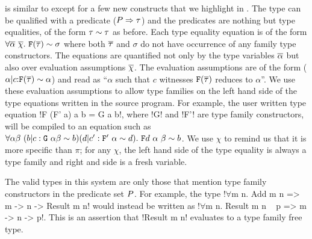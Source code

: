 \documentclass[format=acmsmall,manuscript,review,screen,nonacm,margin=1in,11pt]{acmart}
\begin{document}
\QLTF is similar to \CLTF except for a few new constructs that
we highlight in . The type can be qualified with a predicate ($P\Rightarrow\tau$)
and the predicates are nothing but type equalities, of the form $\tau\mathrel{\sim}\tau$ as before.
Each type equality equation is of the form $\forall\overline{\alpha}~\overline{\chi}.~\texttt{F}(\overline{\tau})\mathrel{\sim}\sigma$
where both $\overline{\tau}$ and $\sigma$ do not have occurrence of any family type constructors. 
The equations are quantified not only by the type variables $\overline{\alpha}$
but also over evaluation assumptions $\overline{\chi}$.
The evaluation assumptions are of the form ($\alpha|c{:}\texttt{F}(\overline{\tau})\mathrel{\sim}\alpha$) and read as
``$\alpha$ such that $c$ witnesses $\texttt{F}(\overline{\tau})$ reduces to $\alpha$''.
We use these evaluation assumptions to allow type families on the left hand side
of the type equations written in the source program. For example,
the user written type equation  !F (F' a) a b = G a b!, where !G! and !F'! are type family constructors,
will be compiled to an equation such as
$\forall\alpha\beta~(b|c:\texttt{G}~\alpha\beta \mathrel{\sim} b)(d|c':\texttt{F}'~\alpha\mathrel{\sim} d).~\texttt{F}d~\alpha~\beta
\mathrel{\sim} b$.
We use $\chi$ to remind us that it is more specific than $\pi$; for any $\chi$,
the left hand side of the type equality is always a type family and right and side is a fresh variable.

The valid types in this system are only those that mention type family constructors in the predicate set $P$.
For example, the type !$\forall$m n. Add m n => m -> n -> Result m n! would instead be written
as !$\forall$m n. Result m n ~ p => m -> n -> p!. This is an assertion that !Result m n! evaluates to a
type family free type.

\end{document}
